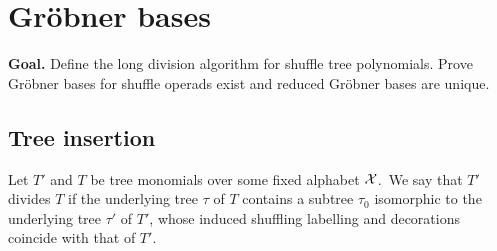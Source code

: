 
\section{Gr\"obner bases}\label{lecture:GB1}

\textbf{Goal.} Define the long division algorithm for shuffle
tree polynomials. Prove Gr\"obner bases for shuffle operads exist
and reduced Gr\"obner bases are unique.

\subsection{Tree insertion}

\begin{definition}
Let $T'$ and $T$ be tree monomials over some fixed alphabet $\mathcal{X}$.\
We say that $T'$ divides $T$ if the underlying tree $\tau$
of $T$ contains a subtree $\tau_0$ isomorphic to the underlying
tree $\tau'$ of $T'$, whose induced shuffling labelling
 and decorations coincide with that of $T'$.
 \end{definition}
